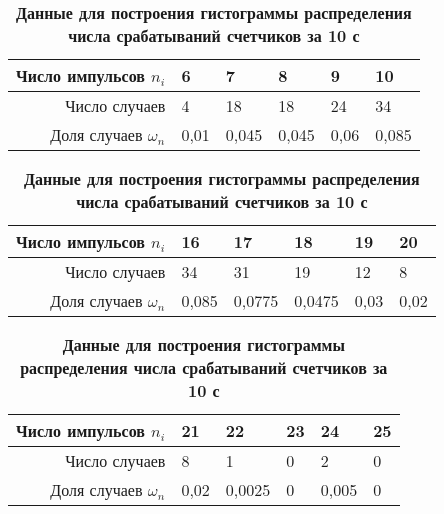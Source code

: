 \documentclass[a4paper, 12pt]{article}%
\begin{document}
\begin{table}
\caption{\textbf{Данные для построения гистограммы распределения числа срабатываний счетчиков за 10 с}}
\begin{tabular}{|r|p{1cm}|p{1cm}|p{1cm}|p{1cm}|p{1cm}|}
\hline
Число импульсов $n_i$&6&7&8&9&10\\
\hline
Число случаев&4&18&18&24&34\\
\hline
Доля случаев $\omega_n$&0,01&0,045&0,045&0,06&0,085\\
\hline
\end{tabular}
\begin{tabular}{|r|p{1cm}|p{1cm}|p{1cm}|p{1cm}|p{1cm}|}
\hline
Число импульсов $n_i$&16&17&18&19&20\\
\hline
Число случаев&34&31&19&12&8\\
\hline
Доля случаев $\omega_n$&0,085&0,0775&0,0475&0,03&0,02\\
\hline
\end{tabular}
\begin{tabular}{|r|p{1cm}|p{1cm}|p{1cm}|p{1cm}|p{1cm}|}
\hline
Число импульсов $n_i$&21&22&23&24&25\\
\hline
Число случаев&8&1&0&2&0\\
\hline
Доля случаев $\omega_n$&0,02&0,0025&0&0,005&0\\
\hline
\end{tabular}
\end{table}
\end{document}
